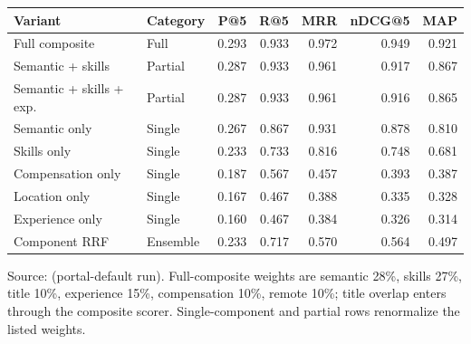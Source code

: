 \caption{Ablation over composite matching components ($K{=}5$).}
\label{tab:ablation}
\begin{tabular}{@{}llrrrrr@{}}
\toprule
Variant & Category & P@5 & R@5 & MRR & nDCG@5 & MAP \\
\midrule
Full composite & Full & 0.293 & 0.933 & 0.972 & 0.949 & 0.921 \\
Semantic + skills & Partial & 0.287 & 0.933 & 0.961 & 0.917 & 0.867 \\
Semantic + skills + exp. & Partial & 0.287 & 0.933 & 0.961 & 0.916 & 0.865 \\
Semantic only & Single & 0.267 & 0.867 & 0.931 & 0.878 & 0.810 \\
Skills only & Single & 0.233 & 0.733 & 0.816 & 0.748 & 0.681 \\
Compensation only & Single & 0.187 & 0.567 & 0.457 & 0.393 & 0.387 \\
Location only & Single & 0.167 & 0.467 & 0.388 & 0.335 & 0.328 \\
Experience only & Single & 0.160 & 0.467 & 0.384 & 0.326 & 0.314 \\
Component RRF & Ensemble & 0.233 & 0.717 & 0.570 & 0.564 & 0.497 \\
\bottomrule
\end{tabular}
\par\vspace{0.4em}
\footnotesize{Source:  (portal-default run). Full-composite weights are semantic 28\%, skills 27\%, title 10\%, experience 15\%, compensation 10\%, remote 10\%; title overlap enters through the composite scorer. Single-component and partial rows renormalize the listed weights.}
